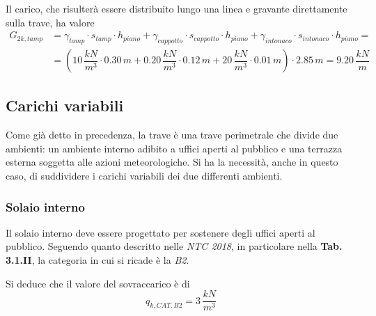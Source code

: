 Il carico, che risulterà essere distribuito lungo una linea e gravante direttamente sulla trave, ha valore
\begin{align*}
 G_{2k, tamp} &= \gamma_{tamp} \cdot s_{tamp} \cdot h_{piano} + \gamma_{cappotto} \cdot s_{cappotto} \cdot h_{piano} + \gamma_{intonaco} \cdot s_{intonaco} \cdot h_{piano} =\\
 &= \left(10\,\dfrac{kN}{m^3}\cdot 0.30\,\si{m} + 0.20\,\dfrac{kN}{m^3}\cdot 0.12\,\si{m} + 20\,\dfrac{kN}{m^3}\cdot 0.01\,\si{m}\right)\cdot 2.85\,\si{m} = 9.20\,\dfrac{kN}{m}
\end{align*}


\subsection{Carichi variabili}
Come già detto in precedenza, la trave è una trave perimetrale che divide due ambienti: un ambiente interno adibito a uffici aperti al pubblico e una terrazza esterna soggetta alle azioni meteorologiche. Si ha la necessità, anche in questo caso, di suddividere i carichi variabili dei due differenti ambienti.

\subsubsection*{Solaio interno}
Il solaio interno deve essere progettato per sostenere degli uffici aperti al pubblico. Seguendo quanto descritto nelle \emph{NTC 2018}, in particolare nella \textbf{Tab. 3.1.II}, la categoria in cui si ricade è la \emph{B2}. 

Si deduce che il valore del sovraccarico è di 
\[
 q_{k, CAT.\,B2} = 3\,\dfrac{kN}{m^3}
\]

